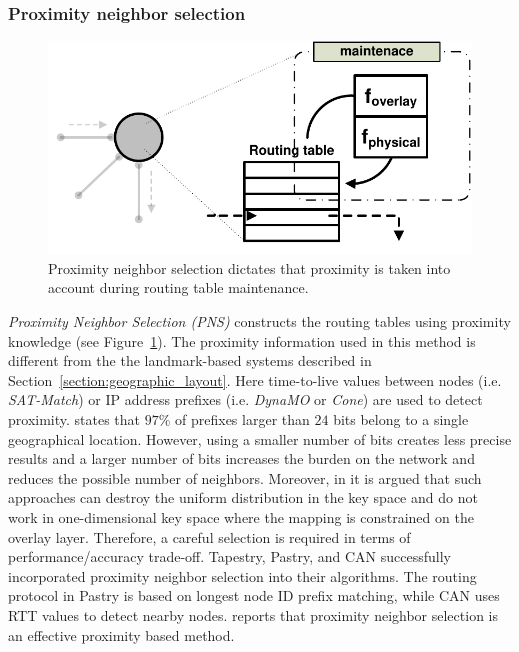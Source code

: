 %
%

\subsubsection{Proximity neighbor selection}

\begin{figure}[ht]
\centering
  \includegraphics[scale=0.4]{img/pdf/proximity-neighbor-selection.pdf}
\caption{Proximity neighbor selection dictates that proximity is taken into
account during routing table maintenance.}
\label{figure:proximity-neighbour-selection}
\end{figure}

\emph{Proximity Neighbor Selection (PNS)} constructs the routing tables using
proximity knowledge (see Figure~\ref{figure:proximity-neighbour-selection}). The
proximity information used in this method is different from the the
landmark-based systems described in Section~\ref{section:geographic_layout}.
Here time-to-live values between nodes (i.e. \emph{SAT-Match}) or IP address
prefixes (i.e. \emph{DynaMO} or \emph{Cone}) are used to detect
proximity. \cite{freedman_iploc_2005} states that $97\%$ of prefixes larger
than $24$ bits belong to a single geographical location. However, using a
smaller number of bits creates less precise results and a larger number of bits
increases the burden on the network and reduces the possible number of
neighbors. Moreover, in \cite{HLYW2005} it is argued that such approaches can
destroy the uniform distribution in the key space and do not work in
one-dimensional key space where the mapping is constrained on the overlay layer.
Therefore, a careful selection is required in terms of
performance/accuracy trade-off. Tapestry, Pastry, and CAN successfully incorporated
proximity neighbor selection into their algorithms. The routing protocol in
Pastry is based on longest node ID prefix matching, while CAN uses RTT values to
detect nearby nodes. \cite{CDCR2002a} reports that proximity neighbor
selection is an effective proximity based method.


